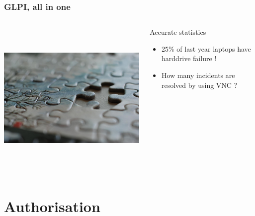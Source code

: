 \documentclass{beamer}
\begin{document}
\begin{frame}


    \frametitle{GLPI, all in one}
 \begin{columns}
 \begin{column}{0.45\textwidth}
         \includegraphics[height=7.5cm]{./pics/glpithelink.jpg}
 \end{column}
 \begin{column}{0.65\textwidth}
    \begin{block}{Accurate statistics}
        \begin{itemize}
            \item 25\% of last year laptops have harddrive failure !
            \item How many incidents are resolved by using VNC  ? 
        \end{itemize}

    \end{block}

 \end{column}
\end{columns}
\end{frame}

\section{Authorisation}
\end{document}
